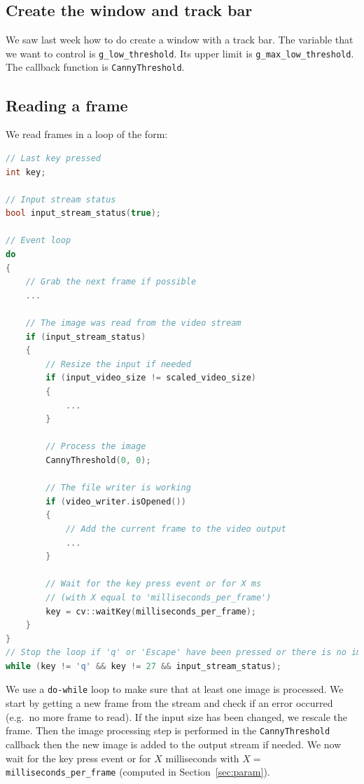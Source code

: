 \documentclass[english,a4paper,12pt,oneside]{article}
\begin{document}
\subsection{Create the window and track bar}

We saw last week how to do create a window with a track bar. 
The variable that we want to control is \verb+g_low_threshold+. 
Its upper limit is \verb+g_max_low_threshold+. 
The callback function is \verb+CannyThreshold+.


\subsection{Reading a frame}

We read frames in a loop of the form:


\begin{lstlisting}[language=c++]
// Last key pressed
int key;	

// Input stream status
bool input_stream_status(true);

// Event loop
do
{
    // Grab the next frame if possible
    ...
        
    // The image was read from the video stream
    if (input_stream_status)
    {
        // Resize the input if needed
        if (input_video_size != scaled_video_size)
        {
            ...
        }
    
        // Process the image
        CannyThreshold(0, 0);
    
        // The file writer is working
        if (video_writer.isOpened())
        {
            // Add the current frame to the video output
            ...
        }
    
        // Wait for the key press event or for X ms
        // (with X equal to 'milliseconds_per_frame')
        key = cv::waitKey(milliseconds_per_frame);
    }
}
// Stop the loop if 'q' or 'Escape' have been pressed or there is no image left in the video stream
while (key != 'q' && key != 27 && input_stream_status);
\end{lstlisting}
We use a \verb+do-while+ loop to make sure that at least one image is processed. 
We start by getting a new frame from the stream and check if an error occurred (e.g.~no more frame to read). 
If the input size has been changed, we rescale the frame.
Then the image processing step is performed in the \verb+CannyThreshold+ callback then the new image is added to the output stream if needed. 
We now wait for the key press event or for $X$ milliseconds with $X=$\verb+milliseconds_per_frame+ (computed in Section~\ref{sec:param}).
\end{document}
